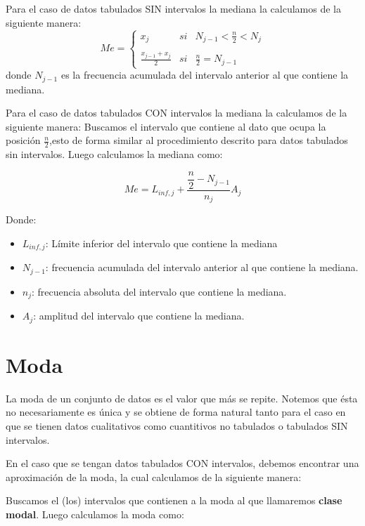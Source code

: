 \documentclass[12pt,twocolumn,a4paper]{report}
\begin{document}
Para el caso de datos tabulados SIN intervalos la mediana la calculamos de la siguiente manera:
\begin{equation*}
Me= \left\{ \begin{array}{lcc}
             x_j & si & N_{j-1} < \frac{n}{2} < N_j \\
             \\ \frac{x_{j-1}+x_j}{2} & si & \frac{n}{2} = N_{j-1}
             \end{array}
   \right.
\end{equation*}
donde $N_{j-1}$ es la frecuencia acumulada del intervalo anterior al que contiene la mediana. 

Para el caso de datos tabulados CON intervalos la mediana la calculamos de la siguiente manera: 
Buscamos el intervalo que contiene al dato que ocupa la posición $\frac{n}{2}$,esto de forma similar al procedimiento descrito para datos tabulados sin intervalos. Luego calculamos la mediana como: 

\begin{equation*}
    Me = L_{inf,j} + \frac{\dfrac{n}{2}- N_{j-1}}{{n_j}}A_j 
\end{equation*}

Donde: 
\begin{itemize}
\setlength\itemsep{0.001cm}
\item{$L_{inf,j}$: Límite inferior del intervalo que contiene la mediana}
\item{$N_{j-1}$: frecuencia acumulada del intervalo anterior al que contiene la mediana.}
\item{$n_j$: frecuencia absoluta del intervalo que contiene la mediana.}
\item{$A_j$: amplitud del intervalo que contiene la mediana.}
\end{itemize}

\section*{Moda}
La moda de un conjunto de datos es el valor que más se repite. Notemos que ésta no necesariamente es única y se obtiene de forma natural tanto para el caso en que se tienen datos cualitativos como cuantitivos no tabulados o tabulados SIN intervalos. 

En el caso que se tengan datos tabulados CON intervalos, debemos encontrar una aproximación de la moda, la cual calculamos de la siguiente manera: 

Buscamos el (los) intervalos que contienen a la moda al que llamaremos \textbf{clase modal}. Luego calculamos la moda como: 
\end{document}
